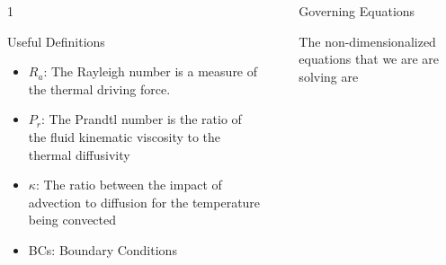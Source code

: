 \documentclass[final]{beamer}
\newlength{\sepwid}
\newlength{\onecolwid}
\newlength{\twocolwid}
\begin{document}
\begin{frame}[t]
\begin{columns}[t]
\begin{column}{1\onecolwid}
\begin{alertblock}{Useful Definitions}
{\small
\begin{itemize}
\item $R_a$: The Rayleigh number is a measure of the thermal driving force.
\item $P_r$: The Prandtl number is the ratio of the fluid kinematic viscosity to the thermal diffusivity
\item $\kappa$: The ratio between the impact of advection to diffusion for the temperature being convected
\item BCs: Boundary Conditions
\end{itemize}
}
\end{alertblock}


\end{column} %
\begin{column}{\sepwid}\end{column} %

\begin{column}{\twocolwid} %

\begin{columns}[t,totalwidth=\twocolwid] %

\begin{column}{\onecolwid}\vspace{-.6in} %


\begin{block}{Governing Equations}

The non-dimensionalized equations that we are are solving are


\end{block}
\end{column}
\end{columns}
\end{column}
\end{columns}
\end{frame}
\end{document}
